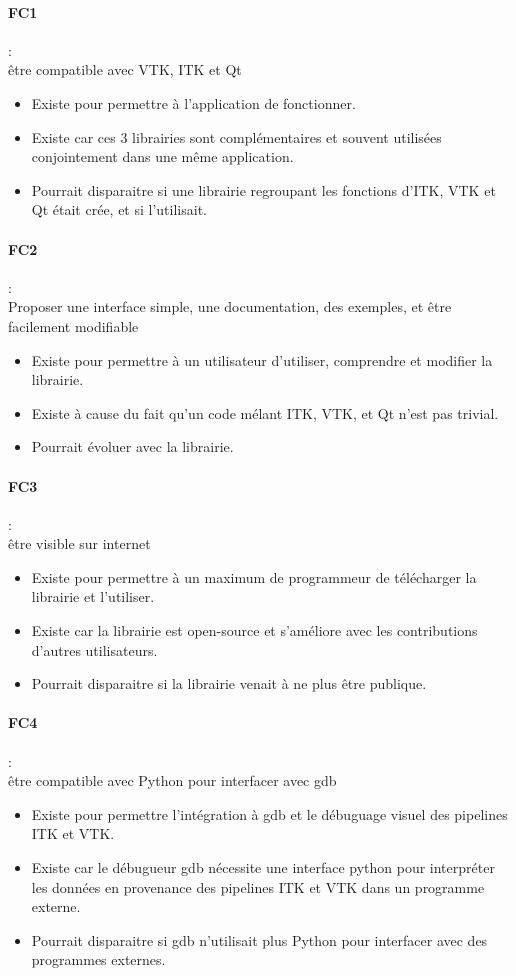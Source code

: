 \paragraph*{FC1} :\\ être compatible avec VTK, ITK et Qt
\begin{itemize}
  \item Existe pour permettre à l'application de fonctionner.
  \item Existe car ces 3 librairies sont complémentaires et souvent utilisées conjointement dans une même application.
  \item Pourrait disparaitre si une librairie regroupant les fonctions d'ITK, VTK et Qt était crée, et si {\gofigure} l'utilisait.
\end{itemize}

\paragraph*{FC2} :\\ Proposer une interface simple, une documentation, des exemples, et être facilement modifiable
\begin{itemize}
  \item Existe pour permettre à un utilisateur d'utiliser, comprendre et modifier la librairie.
  \item Existe à cause du fait qu'un code mélant ITK, VTK, et Qt n'est pas trivial.
  \item Pourrait évoluer avec la librairie.
\end{itemize}

\paragraph*{FC3} :\\ être visible sur internet
\begin{itemize}
  \item Existe pour permettre à un maximum de programmeur de télécharger la librairie et l'utiliser.
  \item Existe car la librairie est open-source et s'améliore avec les contributions d'autres utilisateurs.
  \item Pourrait disparaitre si la librairie venait à ne plus être publique.
\end{itemize}

\paragraph*{FC4} :\\ être compatible avec Python pour interfacer avec gdb
\begin{itemize}
  \item Existe pour permettre l'intégration à gdb et le débuguage visuel des pipelines ITK et VTK.
  \item Existe car le débugueur gdb nécessite une interface python 
  pour interpréter les données en provenance 
  des pipelines ITK et VTK dans un programme externe.
  \item Pourrait disparaitre si gdb n'utilisait plus Python 
  pour interfacer avec des programmes externes.
\end{itemize}

